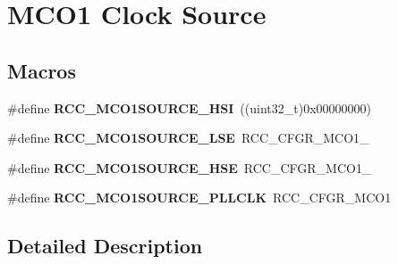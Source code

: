 \hypertarget{group___r_c_c___m_c_o1___clock___source}{}\section{M\+C\+O1 Clock Source}
\label{group___r_c_c___m_c_o1___clock___source}
\subsection*{Macros}
\begin{DoxyCompactItemize}
\item 
\#define {\bfseries R\+C\+C\+\_\+\+M\+C\+O1\+S\+O\+U\+R\+C\+E\+\_\+\+H\+SI}~((uint32\+\_\+t)0x00000000)\hypertarget{group___r_c_c___m_c_o1___clock___source_gad99c388c455852143220397db3730635}{}\label{group___r_c_c___m_c_o1___clock___source_gad99c388c455852143220397db3730635}

\item 
\#define {\bfseries R\+C\+C\+\_\+\+M\+C\+O1\+S\+O\+U\+R\+C\+E\+\_\+\+L\+SE}~R\+C\+C\+\_\+\+C\+F\+G\+R\+\_\+\+M\+C\+O1\+\_\hypertarget{group___r_c_c___m_c_o1___clock___source_gaa01b6cb196df3a4ad690f8bcaa4d0621}{}\label{group___r_c_c___m_c_o1___clock___source_gaa01b6cb196df3a4ad690f8bcaa4d0621}

\item 
\#define {\bfseries R\+C\+C\+\_\+\+M\+C\+O1\+S\+O\+U\+R\+C\+E\+\_\+\+H\+SE}~R\+C\+C\+\_\+\+C\+F\+G\+R\+\_\+\+M\+C\+O1\+\_\hypertarget{group___r_c_c___m_c_o1___clock___source_ga5582d2ab152eb440a6cc3ae4833b043f}{}\label{group___r_c_c___m_c_o1___clock___source_ga5582d2ab152eb440a6cc3ae4833b043f}

\item 
\#define {\bfseries R\+C\+C\+\_\+\+M\+C\+O1\+S\+O\+U\+R\+C\+E\+\_\+\+P\+L\+L\+C\+LK}~R\+C\+C\+\_\+\+C\+F\+G\+R\+\_\+\+M\+C\+O1\hypertarget{group___r_c_c___m_c_o1___clock___source_ga79d888f2238eaa4e4b8d02b3900ea18b}{}\label{group___r_c_c___m_c_o1___clock___source_ga79d888f2238eaa4e4b8d02b3900ea18b}

\end{DoxyCompactItemize}


\subsection{Detailed Description}
